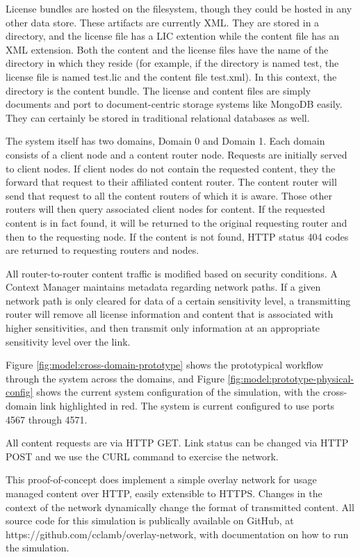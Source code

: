 License bundles are hosted on the filesystem, though they could be hosted in any other data store.  These artifacts are currently XML.  They are stored in a directory, and the license file has a LIC extention while the content file has an XML extension.  Both the content and the license files have the name of the directory in which they reside (for example, if the directory is named test, the license file is named test.lic and the content file test.xml).  In this context, the directory is the content bundle.  The license and content files are simply documents and port to document-centric storage systems like MongoDB easily.  They can certainly be stored in traditional relational databases as well.

The system itself has two domains, Domain 0 and Domain 1.  Each domain consists of a client node and a content router node.  Requests are initially served to client nodes.  If client nodes do not contain the requested content, they the forward that request to their affiliated content router.  The content router will send that request to all the content routers of which it is aware.  Those other routers will then query associated client nodes for content.  If the requested content is in fact found, it will be returned to the original requesting router and then to the requesting node.  If the content is not found, HTTP status 404 codes are returned to requesting routers and nodes.

All router-to-router content traffic is modified based on security conditions.  A Context Manager maintains metadata regarding network paths.  If a given network path is only cleared for data of a certain sensitivity level, a transmitting router will remove all license information and content that is associated with higher sensitivities, and then transmit only information at an appropriate sensitivity level over the link.

Figure \ref{fig:model:cross-domain-prototype} shows the prototypical workflow through the system across the domains, and Figure \ref{fig:model:prototype-physical-config} shows the current system configuration of the simulation, with the cross-domain link highlighted in red.  The system is current configured to use ports 4567 through 4571.

All content requests are via HTTP GET.  Link status can be changed via HTTP POST and we use the CURL command to exercise the network.

This proof-of-concept does implement a simple overlay network for usage managed content over HTTP, easily extensible to HTTPS.  Changes in the context of the network dynamically change the format of transmitted content.  All source code for this simulation is publically available on GitHub, at https://github.com/cclamb/overlay-network, with documentation on how to run the simulation.

